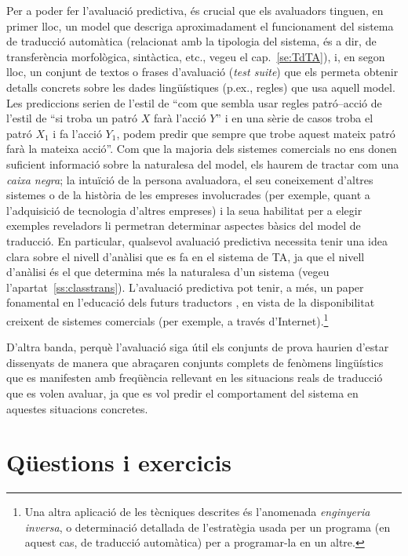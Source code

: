 Per a poder fer l'avaluació predictiva, és crucial que els avaluadors
tinguen, en primer lloc, un model que descriga aproximadament el
funcionament del sistema de traducció automàtica (relacionat amb la
tipologia del sistema, és a dir, de transferència morfològica,
sintàctica, etc., vegeu el cap.~\ref{se:TdTA}), i, en segon lloc, un
conjunt de textos o frases d'avaluació (\emph{test suite}) que els
permeta obtenir detalls concrets sobre les dades lingüístiques (p.ex.,
regles) que usa aquell model.  Les prediccions serien de l'estil de
``com que sembla usar regles patró--acció de l'estil de ``si troba un
patró $X$ farà l'acció $Y$'' i en una sèrie de casos troba el patró
$X_1$ i fa l'acció $Y_1$, podem predir que sempre que trobe aquest
mateix patró farà la mateixa acció''. Com que la majoria dels sistemes
comercials no ens donen suficient informació sobre la naturalesa del
model, els haurem de tractar com una \emph{caixa negra}; la
intuïció de la persona avaluadora, el seu coneixement d'altres
sistemes o de la història de les empreses involucrades (per exemple,
quant a l'adquisició de tecnologia d'altres empreses) i la seua
habilitat per a elegir exemples reveladors li permetran determinar
aspectes bàsics del model de traducció. En particular, qualsevol
avaluació predictiva necessita tenir una idea clara sobre el nivell
d'anàlisi que es fa en el sistema de TA, ja que el nivell d'anàlisi és
el que determina més la naturalesa d'un sistema (vegeu
l'apartat~\ref{ss:classtrans}).  L'avaluació predictiva pot tenir, a
més, un paper fonamental en l'educació dels futurs traductors
\citep{mira98j,forcada00p}, en vista de la disponibilitat creixent de
sistemes comercials (per exemple, a través d'Internet).\footnote{Una
  altra aplicació de les tècniques descrites és l'anomenada
  \emph{enginyeria inversa}, o determinació detallada de l'estratègia
  usada per un programa (en aquest cas, de traducció automàtica) per a
  programar-la en un altre.}

D'altra banda, perquè l'avaluació siga útil els conjunts de prova
haurien d'estar dissenyats de manera que abraçaren conjunts complets
de fenòmens lingüístics que es manifesten amb freqüència rellevant en
les situacions reals de traducció que es volen avaluar, ja que es vol
predir el comportament del sistema en aquestes situacions concretes.


\section{Qüestions i exercicis}

